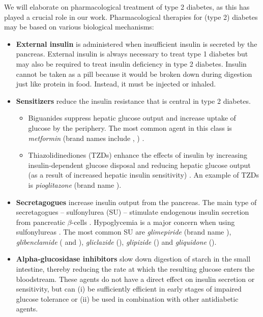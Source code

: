We will elaborate on pharmacological treatment of type 2 diabetes, as this has played a crucial role in our work. Pharmacological therapies for (type 2) diabetes may be based on various biological mechanisms:
\begin{itemize}
\item \textbf{External insulin} is administered when insufficient insulin is secreted by the pancreas. External insulin is always necessary to treat type 1 diabetes but may also be required to treat insulin deficiency in type 2 diabetes. Insulin cannot be taken as a pill because it would be broken down during digestion just like protein in food. Instead, it must be injected or inhaled. \\
\item \textbf{Sensitizers} reduce the insulin resistance that is central in type 2 diabetes.
\begin{itemize}
        \item Biguanides suppress hepatic glucose output and increase uptake of glucose by the periphery. The most common agent in this class is \emph{metformin} (brand names include , ) \citep{kirpichnikov2002metformin}. \\ %
        \item Thiazolidinediones (TZDs) enhance the effects of insulin by increasing insulin-dependent glucose disposal and reducing hepatic glucose output (as a result of increased hepatic insulin sensitivity) \citep{saltiel1996thiazolidinediones, yki2004thiazolidinediones}. 
        An example of TZDs is \emph{pioglitazone} (brand name ). \\
\end{itemize}
\item \textbf{Secretagogues} increase insulin output from the pancreas. The main type of secretagogues -- sulfonylurea (SU) -- stimulate endogenous insulin secretion from pancreatic $\beta$-cells \citep{proks2002sulfonylurea}. Hypoglycemia is a major concern when using sulfonylureas \citep{bodmer2008metformin}.
        The most common SU are \emph{glimepiride} (brand name ), \emph{glibenclamide} ( and ), \emph{gliclazide} (), \emph{glipizide} () and \emph{gliquidone} (). \\
\item \textbf{Alpha-glucosidase inhibitors} slow down digestion of starch in the small intestine, thereby reducing the rate at which the resulting glucose enters the bloodstream. These agents do not have a direct effect on insulin secretion or sensitivity, but can (i) be sufficiently efficient in early stages of impaired glucose tolerance or (ii) be used in combination with other antidiabetic agents. 

\end{itemize}
